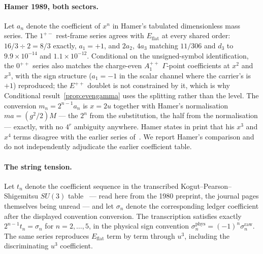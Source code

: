\documentclass[11pt]{article}
\theoremstyle{plain}
\theoremstyle{definition}
\theoremstyle{remark}
\newcommand{\chk}[1]{}
\begin{document}
\paragraph{Hamer 1989, both sectors.} Let $a_n$ denote the coefficient of
$x^n$ in Hamer's tabulated dimensionless mass series. The $1^{+-}$ rest-frame series agrees
with $E_{\mathrm{flat}}$ at every shared order: $16/3\div2=8/3$ exactly,
$a_1=+1$, and $2a_2$, $4a_3$ matching $11/306$ and $d_3$ to $9.9\times10^{-14}$
and $1.1\times10^{-12}$. Conditional on the unsigned-symbol identification,
the $0^{++}$ series also matches the charge-even $A_1^{++}$ $\Gamma$-point
coefficients at $x^2$ and $x^3$, with the sign structure ($a_1=-1$ in the
scalar channel where the carrier's is $+1$) reproduced; the $E^{++}$ doublet is
not constrained by it, which is why Conditional result~\ref{prop:evengamma}
uses the splitting rather than the level. The conversion
$m_n=2^{n-1}a_n$ is $x=2u$ together
with Hamer's normalisation $ma=(g^2/2)M$ --- the $2^n$ from the substitution,
the half from the normalisation --- exactly, with no $4^r$ ambiguity anywhere.
Hamer states in print that his $x^3$ and $x^4$ terms disagree with the earlier
series of~\cite{KSS1976}. We report Hamer's comparison and do not independently
adjudicate the earlier coefficient table.
\chk{Hamer's 1+- series matches the C-odd Gamma-point coefficients through x\^{}3}
\chk{Hamer's 0++ series matches the C-even Gamma-point coefficients through x\^{}3}
\chk{the m\_n = 2\^{}(n-1) a\_n bridge is the x = 2u conversion}
\chk{the Hamer table is pinned, and the a\_4 agreement is primary-source}

\paragraph{The string tension.} Let $t_n$ denote the coefficient sequence in
the transcribed Kogut--Pearson--Shigemitsu $SU(3)$ table~\cite{KPS1981} ---
read here from the 1980 preprint, the journal pages themselves being unread
--- and let $\sigma_n$ denote the corresponding ledger coefficient after the
displayed convention conversion. The transcription satisfies exactly
$2^{n-1}t_n=\sigma_n$ for $n=2,\dots,5$, in the physical sign convention
$\sigma_n^{\mathrm{phys}}=(-1)^n\sigma_n^{\mathrm{raw}}$. The same series
reproduces $E_{\mathrm{flat}}$ term by term through $u^3$, including the
discriminating $u^3$ coefficient.
\chk{the KPS 1980 string-tension table equals the certified sigma series EXACTLY}
\chk{sigma\_n\^{}phys = (-1)\^{}n sigma\_n\^{}raw, and C5 is the n = 3 case}
\chk{the ratio and sigma series reproduce E\_flat exactly}
\end{document}

